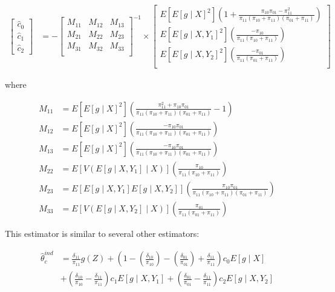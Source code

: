 \documentclass[12pt]{article}
\begin{document}
\begin{align*}
  \begin{bmatrix} \hat c_0 \\ \hat c_1 \\ \hat c_2 \end{bmatrix} 
  &= -
  \begin{bmatrix} 
    M_{11} & M_{12} & M_{13} \\
    M_{21} & M_{22} & M_{23} \\
    M_{31} & M_{32} & M_{33} \\
  \end{bmatrix}^{-1}
  \times 
  \begin{bmatrix}
    E[E[g \mid X]^2] \left(1 + \frac{\pi_{10}\pi_{01} - \pi_{11}^2}{\pi_{11}(\pi_{10} + \pi_{11})(\pi_{01} + \pi_{11})}\right) \\
    E[E[g \mid X, Y_1]^2] \left(\frac{-\pi_{10}}{\pi_{11}(\pi_{10} + \pi_{11})}\right) \\
    E[E[g \mid X, Y_2]^2] \left(\frac{-\pi_{01}}{\pi_{11}(\pi_{01} + \pi_{11})}\right) \\
  \end{bmatrix}
\end{align*}

where 

\begin{align*}
  M_{11} &= E[E[g \mid X]^2] \left(\frac{\pi_{11}^2 + \pi_{10}\pi_{01}}{\pi_{11}(\pi_{10} + \pi_{11})(\pi_{01} + \pi_{11})} - 1\right) \\
  M_{12} &= E[E[g \mid X]^2] \left(\frac{-\pi_{10}\pi_{01}}{\pi_{11}(\pi_{10} + \pi_{11})(\pi_{01} + \pi_{11})}\right) \\
  M_{13} &= E[E[g \mid X]^2] \left(\frac{-\pi_{10}\pi_{01}}{\pi_{11}(\pi_{10} + \pi_{11})(\pi_{01} + \pi_{11})}\right) \\
  M_{22} &= E[V(E[g \mid X, Y_1] \mid X)] \left(\frac{\pi_{10}}{\pi_{11}(\pi_{10} + \pi_{11})}\right) \\
  M_{23} &= E[E[g \mid X, Y_1]E[g \mid X, Y_2]] \left(\frac{\pi_{10}\pi_{01}}{\pi_{11}(\pi_{10} + \pi_{11})(\pi_{01} + \pi_{11})}\right) \\
  M_{33} &= E[V(E[g \mid X, Y_2] \mid X)] \left(\frac{\pi_{01}}{\pi_{11}(\pi_{01} + \pi_{11})}\right)
\end{align*}

This estimator is similar to several other estimators:

\begin{align}\label{thetaind}
  \hat \theta^{ind}_c 
  &= \frac{\delta_{11}}{\pi_{11}} g(Z) + \left(1 -
    \left(\frac{\delta_{10}}{\pi_{10}}\right) -
    \left(\frac{\delta_{01}}{\pi_{01}}\right) + 
  \frac{\delta_{11}}{\pi_{11}}\right) c_0 E[g \mid X] \\ \nonumber
  &+
  \left(\frac{\delta_{10}}{\pi_{10}} - 
  \frac{\delta_{11}}{\pi_{11}}\right) c_1 E[g \mid X, Y_1] +
  \left(\frac{\delta_{01}}{\pi_{01}} - 
  \frac{\delta_{11}}{\pi_{11}}\right) c_2 E[g \mid X, Y_2]
\end{align}
\end{document}
